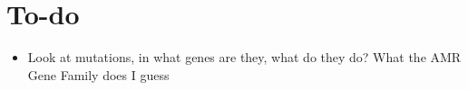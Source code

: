 \section{To-do}
\begin{itemize}
    \item Look at mutations, in what genes are they, what do they do? What the AMR Gene Family does I guess 
\end{itemize}


